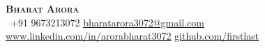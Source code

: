\begin{center}
    \textbf{\Huge \scshape Bharat Arora} \\ \vspace{1pt}
     \ \small +91 9673213072 \quad
    \href{mailto:fibharatarora3072stlast@gmail.com}{ \underline{bharatarora3072@gmail.com}} \quad
    \href{www.linkedin.com/in/arorabharat3072}{ \underline{www.linkedin.com/in/arorabharat3072}} \quad
    \href{https://github.com/}{ \underline{github.com/firstlast}}
\end{center}
